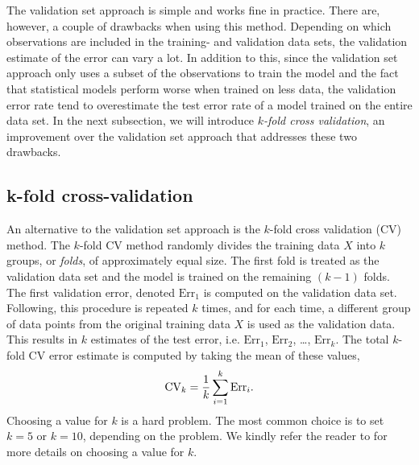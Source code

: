 The validation set approach is simple and works fine in practice. There are, however, a couple of drawbacks when using this method. Depending on which observations are included in the training- and validation data sets, the validation estimate of the error can vary a lot. In addition to this, since the validation set approach only uses a subset of the observations to train the model and the fact that statistical models perform worse when trained on less data, the validation error rate tend to overestimate the test error rate of a model trained on the entire data set. In the next subsection, we will introduce \textit{$k$-fold cross validation}, an improvement over the validation set approach that addresses these two drawbacks.

\subsection{k-fold cross-validation}
An alternative to the validation set approach is the $k$-fold cross validation (CV) method. The $k$-fold CV method randomly divides the training data $X$ into $k$ groups, or \textit{folds}, of approximately equal size. The first fold is treated as the validation data set and the model is trained on the remaining $(k - 1)$ folds. The first validation error, denoted $\text{Err}_1$ is computed on the validation data set. Following, this procedure is repeated $k$ times, and for each time, a different group of data points from the original training data $X$ is used as the validation data. This results in $k$ estimates of the test error, i.e. $\text{Err}_1$, $\text{Err}_2$, \ldots, $\text{Err}_k$. The total $k$-fold CV error estimate is computed by taking the mean of these values,
\begin{align}
    \text{CV}_k = \frac{1}{k} \sum\limits_{i=1}^{k} \text{Err}_i.
\end{align}
Choosing a value for $k$ is a hard problem. The most common choice is to set $k=5$ or $k=10$, depending on the problem. We kindly refer the reader to \cite[Section 5.1.4]{James2013} for more details on choosing a value for $k$.

